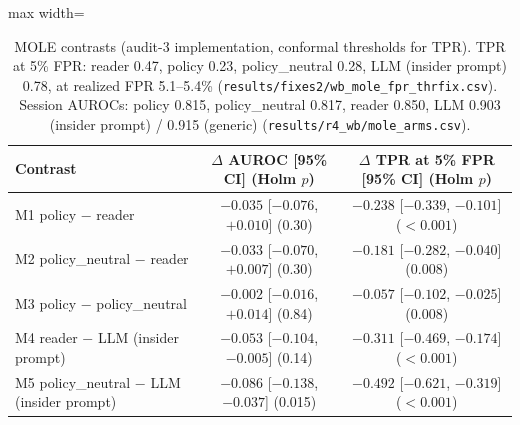 \documentclass[11pt]{article}
\begin{document}
\begin{table}[!htbp]\centering\small
\begin{adjustbox}{max width=\linewidth}\begin{tabular}{@{}lcc@{}}
\toprule
Contrast & $\Delta$ AUROC [95\% CI] (Holm $p$) & $\Delta$ TPR at 5\% FPR [95\% CI] (Holm $p$)\\
\midrule
M1 policy $-$ reader & $-0.035$ [$-0.076$, $+0.010$] (0.30) & $\mathbf{-0.238}$ [$-0.339$, $-0.101$] ($<0.001$)\\
M2 policy\_neutral $-$ reader & $-0.033$ [$-0.070$, $+0.007$] (0.30) & $-0.181$ [$-0.282$, $-0.040$] (0.008)\\
M3 policy $-$ policy\_neutral & $-0.002$ [$-0.016$, $+0.014$] (0.84) & $\mathbf{-0.057}$ [$-0.102$, $-0.025$] (0.008)\\
M4 reader $-$ LLM (insider prompt) & $-0.053$ [$-0.104$, $-0.005$] (0.14) & $-0.311$ [$-0.469$, $-0.174$] ($<0.001$)\\
M5 policy\_neutral $-$ LLM (insider prompt) & $-0.086$ [$-0.138$, $-0.037$] (0.015) & $-0.492$ [$-0.621$, $-0.319$] ($<0.001$)\\
\bottomrule
\end{tabular}\end{adjustbox}
\caption{MOLE contrasts (audit-3 implementation, conformal thresholds for TPR). TPR at 5\% FPR: reader 0.47, policy 0.23, policy\_neutral 0.28, LLM (insider prompt) 0.78, at realized FPR 5.1--5.4\% (\nolinkurl{results/fixes2/wb_mole_fpr_thrfix.csv}). Session AUROCs: policy 0.815, policy\_neutral 0.817, reader 0.850, LLM 0.903 (insider prompt) / 0.915 (generic) (\nolinkurl{results/r4_wb/mole_arms.csv}).}\label{tab:r4mole}
\end{table}
\end{document}
